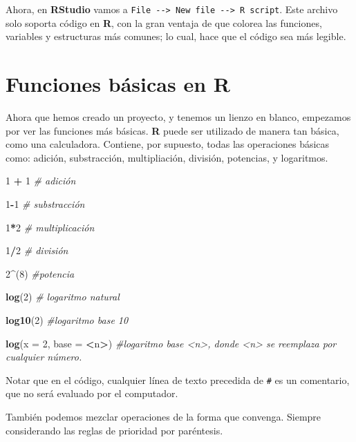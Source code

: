 \documentclass[12pt,letterpaper,]{book}
\newenvironment{Shaded}{\begin{snugshade}}{\end{snugshade}}
\newcommand{\KeywordTok}[1]{\textcolor[rgb]{0.13,0.29,0.53}{\textbf{#1}}}
\newcommand{\DataTypeTok}[1]{\textcolor[rgb]{0.13,0.29,0.53}{#1}}
\newcommand{\DecValTok}[1]{\textcolor[rgb]{0.00,0.00,0.81}{#1}}
\newcommand{\StringTok}[1]{\textcolor[rgb]{0.31,0.60,0.02}{#1}}
\newcommand{\CommentTok}[1]{\textcolor[rgb]{0.56,0.35,0.01}{\textit{#1}}}
\newcommand{\OperatorTok}[1]{\textcolor[rgb]{0.81,0.36,0.00}{\textbf{#1}}}
\newcommand{\NormalTok}[1]{#1}
\begin{document}
Ahora, en \textbf{RStudio} vamos a
\texttt{File\ -\/-\textgreater{}\ New\ file\ -\/-\textgreater{}\ R\ script}.
Este archivo solo soporta código en \textbf{R}, con la gran ventaja de
que colorea las funciones, variables y estructuras más comunes; lo cual,
hace que el código sea más legible.

\section{Funciones básicas en R}\label{funciones-basicas-en-r}

Ahora que hemos creado un proyecto, y tenemos un lienzo en blanco,
empezamos por ver las funciones más básicas. \textbf{R} puede ser
utilizado de manera tan básica, como una calculadora. Contiene, por
supuesto, todas las operaciones básicas como: adición, substracción,
multipliación, división, potencias, y logaritmos.

\begin{Shaded}
\begin{Highlighting}[]
\DecValTok{1} \OperatorTok{+}\StringTok{ }\DecValTok{1} \CommentTok{# adición}

\DecValTok{1}\OperatorTok{-}\DecValTok{1} \CommentTok{# substracción}

\DecValTok{1}\OperatorTok{*}\DecValTok{2} \CommentTok{# multiplicación}

\DecValTok{1}\OperatorTok{/}\DecValTok{2} \CommentTok{# división}

\DecValTok{2}\OperatorTok{^}\NormalTok{(}\DecValTok{8}\NormalTok{) }\CommentTok{#potencia}

\KeywordTok{log}\NormalTok{(}\DecValTok{2}\NormalTok{) }\CommentTok{# logaritmo natural}

\KeywordTok{log10}\NormalTok{(}\DecValTok{2}\NormalTok{) }\CommentTok{#logaritmo base 10}

\KeywordTok{log}\NormalTok{(}\DataTypeTok{x =} \DecValTok{2}\NormalTok{, }\DataTypeTok{base =} \OperatorTok{<}\NormalTok{n}\OperatorTok{>}\NormalTok{) }\CommentTok{#logaritmo base <n>, donde <n> se reemplaza por cualquier número.}
\end{Highlighting}
\end{Shaded}

Notar que en el código, cualquier línea de texto precedida de
\texttt{\#} es un comentario, que no será evaluado por el computador.

También podemos mezclar operaciones de la forma que convenga. Siempre
considerando las reglas de prioridad por paréntesis.
\end{document}
